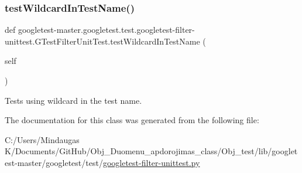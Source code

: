 \subsubsection{\texorpdfstring{testWildcardInTestName()}{testWildcardInTestName()}}
{\footnotesize\ttfamily def googletest-\/master.\+googletest.\+test.\+googletest-\/filter-\/unittest.\+G\+Test\+Filter\+Unit\+Test.\+test\+Wildcard\+In\+Test\+Name (\begin{DoxyParamCaption}\item[{}]{self }\end{DoxyParamCaption})}

\begin{DoxyVerb}Tests using wildcard in the test name.\end{DoxyVerb}
 

The documentation for this class was generated from the following file\+:\begin{DoxyCompactItemize}
\item 
C\+:/\+Users/\+Mindaugas K/\+Documents/\+Git\+Hub/\+Obj\+\_\+\+Duomenu\+\_\+apdorojimas\+\_\+class/\+Obj\+\_\+test/lib/googletest-\/master/googletest/test/\mbox{\hyperlink{_obj__test_2lib_2googletest-master_2googletest_2test_2googletest-filter-unittest_8py}{googletest-\/filter-\/unittest.\+py}}\end{DoxyCompactItemize}
